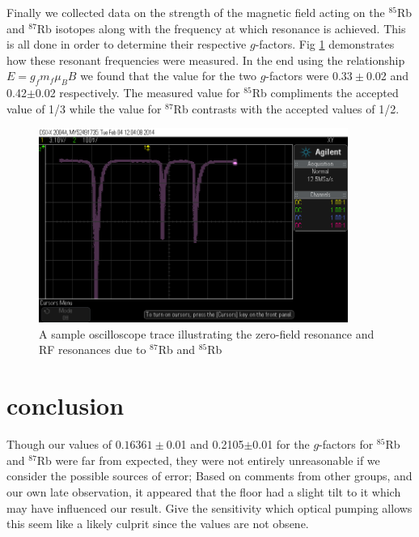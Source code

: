 \documentclass[prb,preprint]{revtex4-1}
\begin{document}
Finally we collected data on the strength of the magnetic field acting on the $^{85}$Rb and  $^{87}$Rb isotopes along with the frequency at which resonance is achieved. This is all done in order to determine their respective $g$-factors. Fig \ref{LC2} demonstrates how these resonant frequencies were measured. In the end using the relationship $E=g_fm_f\mu_BB$ we found that the value for the two $g$-factors were $0.33\pm$0.02 and 0.42$\pm$0.02 respectively. The measured value for $^{85}$Rb compliments the accepted value of 1/3 while the value for $^{87}$Rb contrasts with the accepted values of 1/2. 

\newpage
\begin{figure}[h!]
\centering
\includegraphics[width=0.9\textwidth]{scope_0.png}
\caption{A sample oscilloscope trace illustrating the zero-field resonance and RF resonances due to $^{87}$Rb and $^{85}$Rb}
\label{LC2}
\end{figure}
\newpage

\section{conclusion}
Though our values of $0.16361\pm$0.01 and 0.2105$\pm$0.01 for the $g$-factors for $^{85}$Rb and  $^{87}$Rb were far from expected, they were not entirely unreasonable if we consider the possible sources of error; Based on comments from other groups, and our own late observation, it appeared that the floor had a slight tilt to it which may have influenced our result. Give the sensitivity which optical pumping allows this seem like a likely culprit since the values are not obsene.
\end{document}
